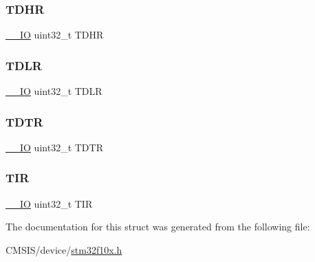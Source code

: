\subsubsection{\texorpdfstring{TDHR}{TDHR}}
{\footnotesize\ttfamily \mbox{\hyperlink{core__sc300_8h_aec43007d9998a0a0e01faede4133d6be}{\+\_\+\+\_\+\+IO}} uint32\+\_\+t T\+D\+HR}

\mbox{\label{struct_c_a_n___tx_mail_box___type_def_aded1359e1a32512910bff534d57ade68}} 
\subsubsection{\texorpdfstring{TDLR}{TDLR}}
{\footnotesize\ttfamily \mbox{\hyperlink{core__sc300_8h_aec43007d9998a0a0e01faede4133d6be}{\+\_\+\+\_\+\+IO}} uint32\+\_\+t T\+D\+LR}

\mbox{\label{struct_c_a_n___tx_mail_box___type_def_aed87bed042dd9523ce086119a3bab0ea}} 
\subsubsection{\texorpdfstring{TDTR}{TDTR}}
{\footnotesize\ttfamily \mbox{\hyperlink{core__sc300_8h_aec43007d9998a0a0e01faede4133d6be}{\+\_\+\+\_\+\+IO}} uint32\+\_\+t T\+D\+TR}

\mbox{\label{struct_c_a_n___tx_mail_box___type_def_a6921aa1c578a7d17c6e0eb33a73b6630}} 
\subsubsection{\texorpdfstring{TIR}{TIR}}
{\footnotesize\ttfamily \mbox{\hyperlink{core__sc300_8h_aec43007d9998a0a0e01faede4133d6be}{\+\_\+\+\_\+\+IO}} uint32\+\_\+t T\+IR}



The documentation for this struct was generated from the following file\+:\begin{DoxyCompactItemize}
\item 
C\+M\+S\+I\+S/device/\mbox{\hyperlink{stm32f10x_8h}{stm32f10x.\+h}}\end{DoxyCompactItemize}

